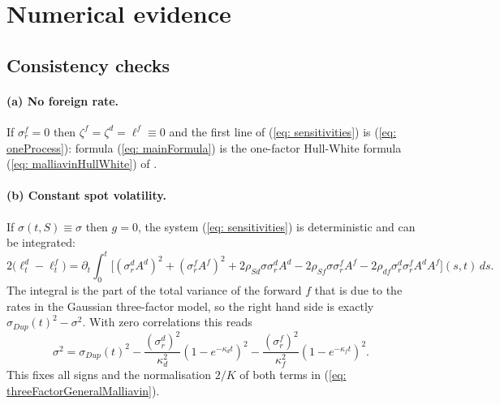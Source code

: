 \section{Numerical evidence}\label{sec: evidence}
\subsection{Consistency checks}\label{subsec: checks}

\paragraph{(a) No foreign rate.} If $\sigma^f_r=0$ then $\zeta^f=\zeta^d=\ell^f\equiv 0$ and the first line of (\ref{eq: sensitivities}) is (\ref{eq: oneProcess}): formula (\ref{eq: mainFormula}) is the one-factor Hull-White formula (\ref{eq: malliavinHullWhite}) of \cite{guyonLabordere}.

\paragraph{(b) Constant spot volatility.} If $\sigma(t,S)\equiv\sigma$ then $g=0$, the system (\ref{eq: sensitivities}) is deterministic and can be integrated:
$$ 2\big(\ell^d_t-\ell^f_t\big)=\partial_t\int_0^t\Big[
(\sigma^d_r A^d)^2+(\sigma^f_r A^f)^2+2\rho_{Sd}\sigma\sigma^d_r A^d-2\rho_{Sf}\sigma\sigma^f_r A^f
-2\rho_{df}\sigma^d_r\sigma^f_r A^dA^f\Big](s,t)\,ds . $$
The integral is the part of the total variance of the forward $f$ that is due to the rates in the Gaussian three-factor model, so the right hand side is exactly $\sigma_{Dup}(t)^2-\sigma^2$. With zero correlations this reads
$$ \sigma^2=\sigma_{Dup}(t)^2-\frac{(\sigma^d_r)^2}{\kappa_d^2}(1-e^{-\kappa_dt})^2-\frac{(\sigma^f_r)^2}{\kappa_f^2}(1-e^{-\kappa_ft})^2 . $$
This fixes all signs and the normalisation $2/K$ of both terms in (\ref{eq: threeFactorGeneralMalliavin}).

